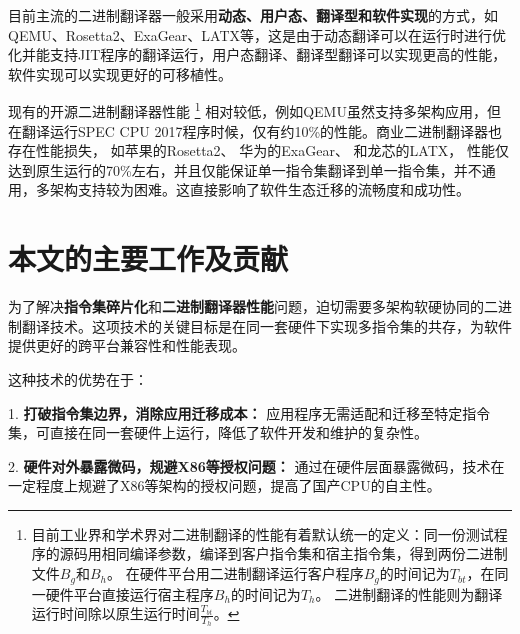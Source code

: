 目前主流的二进制翻译器一般采用\textbf{动态、用户态、翻译型和软件实现}的方式，如QEMU\cite{bellardQEMUFastPortable2005}、Rosetta2\cite{RosettaTranslationEnvironment, RunningIntelBinaries}、ExaGear\cite{KunPengExaGear}、LATX\cite{LoongArchEnv2022, LoongArch2023}等，这是由于动态翻译可以在运行时进行优化并能支持JIT程序的翻译运行，用户态翻译、翻译型翻译可以实现更高的性能，软件实现可以实现更好的可移植性。


现有的开源二进制翻译器性能
\footnote{
    目前工业界和学术界对二进制翻译的性能有着默认统一的定义：同一份测试程序的源码用相同编译参数，编译到客户指令集和宿主指令集，得到两份二进制文件$B_g$和$B_h$。
    在硬件平台用二进制翻译运行客户程序$B_g$的时间记为$T_{bt}$，在同一硬件平台直接运行宿主程序$B_h$的时间记为$T_h$。
    二进制翻译的性能则为翻译运行时间除以原生运行时间$\frac{T_{bt}}{T_h}$。
}
相对较低，例如QEMU\cite{bellardQEMUFastPortable2005}虽然支持多架构应用，但在翻译运行SPEC CPU 2017\cite{SPECCPU2017}程序时候，仅有约10\%的性能。商业二进制翻译器也存在性能损失，
如苹果的Rosetta2\cite{RosettaTranslationEnvironment, RunningIntelBinaries}、
华为的ExaGear\cite{KunPengExaGear}、
和龙芯的LATX\cite{LoongArchEnv2022, LoongArch2023}，
性能仅达到原生运行的70\%左右，并且仅能保证单一指令集翻译到单一指令集，并不通用，多架构支持较为困难。这直接影响了软件生态迁移的流畅度和成功性。

\section{本文的主要工作及贡献}

为了解决\textbf{指令集碎片化}和\textbf{二进制翻译器性能}问题，迫切需要多架构软硬协同的二进制翻译技术。这项技术的关键目标是在同一套硬件下实现多指令集的共存，为软件提供更好的跨平台兼容性和性能表现。

这种技术的优势在于：

1. \textbf{打破指令集边界，消除应用迁移成本：} 应用程序无需适配和迁移至特定指令集，可直接在同一套硬件上运行，降低了软件开发和维护的复杂性。

2. \textbf{硬件对外暴露微码，规避X86等授权问题：} 通过在硬件层面暴露微码，技术在一定程度上规避了X86等架构的授权问题，提高了国产CPU的自主性。

